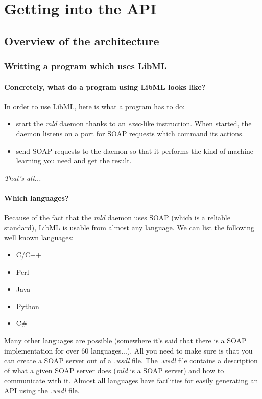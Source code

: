 \part{Getting into the API}

\chapter{Overview of the architecture}

\section{Writting a program which uses LibML}
\subsection{Concretely, what do a program using LibML looks like?}

In order to use LibML, here is what a program has to do:
\begin{itemize}
\item start the \textit{mld} daemon thanks to an \textit{exec}-like instruction. When started, the daemon listens on a port for SOAP requests which command its actions.
\item send SOAP requests to the daemon so that it performs the kind of machine learning you need and get the result.
\end{itemize}

\textit{That's all...}

\bigskip

\subsection{Which languages?}

Because of the fact that the \textit{mld} daemon uses SOAP (which is a reliable standard), LibML is usable from almost any language. We can list the following well known languages:
\begin{itemize}
\item C/C++
\item Perl
\item Java
\item Python
\item C\#
\end{itemize}
Many other languages are possible (somewhere it's said that there is a SOAP
implementation for over 60 languages...). All you need to make sure is that
you can create a SOAP server out of a \textit{.wsdl} file. The \textit{.wsdl}
file contains a description of what a given SOAP server does (\textit{mld} is
a SOAP server) and how to communicate with it. Almost all languages have
facilities for easily generating an API using the \textit{.wsdl} file.

